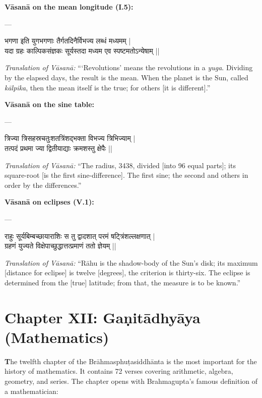 \documentclass[11pt,a4paper]{article}
\newcommand{\shloka}[1]{{\devanagarifont\setlength{\leftskip}{2em}#1\par\medskip}}
\begin{document}
\medskip
\noindent\textbf{Vāsanā on the mean longitude (I.5):}

---\shloka{%
भगणा इति युगभगणाः तैर्गतदिनैर्विभज्य लब्धं मध्यमम् |\\
यदा ग्रहः काल्पिकसंज्ञकः सूर्यस्तदा मध्यम एव स्पष्टमतोऽन्येषाम् ||
}

\textit{Translation of Vāsanā:} ```Revolutions' means the revolutions in a \textit{yuga}. Dividing by the elapsed days, the result is the mean. When the planet is the Sun, called \textit{kālpika}, then the mean itself is the true; for others [it is different].''

\medskip
\noindent\textbf{Vāsanā on the sine table:}

---\shloka{%
त्रिज्या त्रिसहस्रचतुःशतत्रिंशद्भक्ता विभज्य त्रिभिज्याम् |\\
तत्पदं प्रथमा ज्या द्वितीयाद्याः क्रमशस्तु क्षेपैः ||
}

\textit{Translation of Vāsanā:} ``The radius, 3438, divided [into 96 equal parts]; its square-root [is the first sine-difference]. The first sine; the second and others in order by the differences.''

\medskip
\noindent\textbf{Vāsanā on eclipses (V.1):}

---\shloka{%
राहुः सूर्यबिम्बच्छायाराशिः स तु द्वादशात् परमं षट्त्रिंशल्लक्षणात् |\\
ग्रहणं युज्यते विक्षेपाच्छुद्धात्तत्प्रमाणं ततो ज्ञेयम् ||
}

\textit{Translation of Vāsanā:} ``Rāhu is the shadow-body of the Sun's disk; its maximum [distance for eclipse] is twelve [degrees], the criterion is thirty-six. The eclipse is determined from the [true] latitude; from that, the measure is to be known.''

\clearpage

\section*{Chapter XII: Gaṇitādhyāya (Mathematics)}

\textbf{T}he twelfth chapter of the Br\=ahmasphu\d tasiddh\=anta is the most important for the history of mathematics. It contains 72 verses covering arithmetic, algebra, geometry, and series. The chapter opens with Brahmagupta's famous definition of a mathematician:
\end{document}

